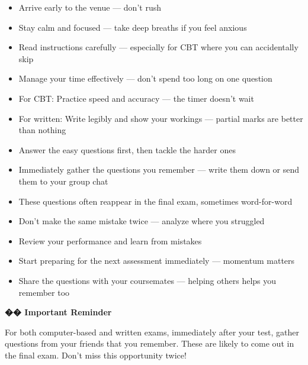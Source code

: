 \documentclass[11pt,a4paper]{article}
\begin{document}
\begin{tcolorbox}[colback=lightGray,colframe=primary,title={\color{white}\textbf{�� On Test/Exam Day}},colbacktitle=primary,arc=4pt,breakable]
\begin{itemize}[leftmargin=1em, itemsep=0.3em]
    \item Arrive early to the venue --- don't rush
    \item Stay calm and focused --- take deep breaths if you feel anxious
    \item Read instructions carefully --- especially for CBT where you can accidentally skip
    \item Manage your time effectively --- don't spend too long on one question
    \item For CBT: Practice speed and accuracy --- the timer doesn't wait
    \item For written: Write legibly and show your workings --- partial marks are better than nothing
    \item Answer the easy questions first, then tackle the harder ones
\end{itemize}
\end{tcolorbox}

\begin{tcolorbox}[colback=lightGray,colframe=primary,title={\color{white}\textbf{�� After Tests/Exams}},colbacktitle=primary,arc=4pt,breakable]
\begin{itemize}[leftmargin=1em, itemsep=0.3em]
    \item Immediately gather the questions you remember --- write them down or send them to your group chat
    \item These questions often reappear in the final exam, sometimes word-for-word
    \item Don't make the same mistake twice --- analyze where you struggled
    \item Review your performance and learn from mistakes
    \item Start preparing for the next assessment immediately --- momentum matters
    \item Share the questions with your coursemates --- helping others helps you remember too
\end{itemize}
\end{tcolorbox}

\begin{inspirational}
    \textbf{\color{primary}\Large �� Important Reminder}

    \vspace{0.5em}

    For both computer-based and written exams, immediately after your test, gather questions from your friends that you remember. These are likely to come out in the final exam. Don't miss this opportunity twice!
\end{inspirational}
\end{document}
